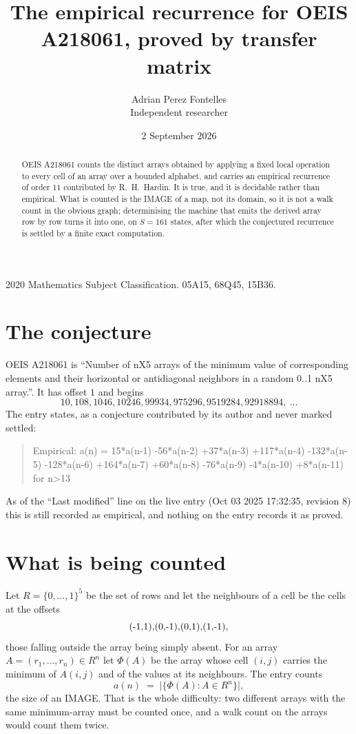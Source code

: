\documentclass[11pt,a4paper]{article}
\title{The empirical recurrence for OEIS A218061, proved by transfer matrix}
\author{Adrian Perez Fontelles\\ \small Independent researcher}
\date{2 September 2026}
\theoremstyle{plain}
\theoremstyle{definition}
\begin{document}
\maketitle

\begin{abstract}
OEIS A218061 counts the distinct arrays obtained by applying a fixed local operation to every cell
of an array over a bounded alphabet, and carries an empirical recurrence of order $11$
contributed by R.~H.~Hardin. It is true, and it is decidable rather than empirical. What is
counted is the IMAGE of a map, not its domain, so it is not a walk count in the obvious graph;
determinising the machine that emits the derived array row by row turns it into one, on
$S=161$ states, after which the conjectured recurrence is settled by a finite exact
computation.
\end{abstract}

\noindent\small 2020 Mathematics Subject Classification. 05A15, 68Q45, 15B36.\normalsize

\section{The conjecture}

OEIS A218061 is ``Number of nX5 arrays of the minimum value of corresponding elements and their horizontal or antidiagonal neighbors in a random 0..1 nX5 array.''. It has offset $1$ and begins
\[
10, 108, 1046, 10246, 99934, 975296, 9519284, 92918894,\ \dots
\]
The entry states, as a conjecture contributed by its author and never marked settled:
\begin{quote}
Empirical: a(n) = 15*a(n-1) -56*a(n-2) +37*a(n-3) +117*a(n-4) -132*a(n-5) -128*a(n-6) +164*a(n-7) +60*a(n-8) -76*a(n-9) -4*a(n-10) +8*a(n-11) for n>13
\end{quote}
As of the ``Last modified'' line on the live entry (Oct 03 2025 17:32:35, revision 8) this is still
recorded as empirical, and nothing on the entry records it as proved.

\section{What is being counted}

Let $R=\{0,\dots,1\}^{5}$ be the set of rows and let the neighbours of
a cell be the cells at the offsets
\[
$(-1,1)$, $(0,-1)$, $(0,1)$, $(1,-1)$,
\]
those falling outside the array being simply absent. For an array
$A=(r_1,\dots,r_n)\in R^n$ let $\Phi(A)$ be the array whose cell $(i,j)$ carries the
minimum of $A(i,j)$ and of the values at its neighbours. The entry counts
\[
a(n)\;=\;\bigl|\{\Phi(A):A\in R^n\}\bigr| ,
\]
the size of an IMAGE. That is the whole difficulty: two different arrays with the same
minimum-array must be counted once, and a walk count on the arrays would count them twice.
\end{document}
